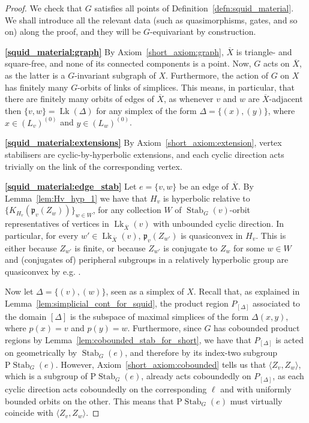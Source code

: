 \documentclass[svgnames]{amsart}
\theoremstyle{plain}
\theoremstyle{definition}
\newcommand{\ov}[1]{\overline{#1}}
\newcommand{\link}{\operatorname{Lk}}
\newcommand{\Stab}[2]{\operatorname{Stab}_{#1}(#2)}
\newcommand{\p}{\mathfrak{p}}
\begin{document}
\begin{proof}
We check that $G$ satisfies all points of Definition~\ref{defn:squid_material}. We shall introduce all the relevant data (such as quasimorphisms, gates, and so on) along the proof, and they will be $G$-equivariant by construction.

\par\medskip
\textbf{\eqref{squid_material:graph}} By Axiom~\eqref{short_axiom:graph}, $\ov X$ is triangle- and square-free, and none of its connected components is a point. Now, $G$ acts on $\ov X$, as the latter is a $G$-invariant subgraph of $X$. Furthermore, the action of $G$ on $X$ has finitely many $G$-orbits of links of simplices. This means, in particular, that there are finitely many orbits of edges of $\ov{X}$, as whenever $v$ and $w$ are $\ov{X}$-adjacent then $\{v,w\}=\link(\Delta)$ for any simplex of the form $\Delta=\{(x), (y)\}$, where $x\in (L_v)^{(0)}$ and $y\in (L_w)^{(0)}$.

\par\medskip
\textbf{\eqref{squid_material:extensions}} By Axiom~\eqref{short_axiom:extension}, vertex stabilisers are cyclic-by-hyperbolic extensions, and each cyclic direction acts trivially on the link of the corresponding vertex.

\par\medskip
\textbf{\eqref{squid_material:edge_stab}} Let $e=\{v,w\}$ be an edge of $\ov{X}$. By Lemma~\ref{lem:Hv_hyp_1} we have that $H_v$ is hyperbolic relative to $\{K_{H_v}(\p_v(Z_w))\}_{w\in W}$, for any collection $W$ of $\Stab{G}{v}$-orbit representatives of vertices in $\link_{\ov X}(v)$ with unbounded cyclic direction. In particular, for every $w'\in\link_{\ov X}(v)$, $\p_v(Z_{w'})$ is quasiconvex in $H_v$. This is either because $Z_{w'}$ is finite, or because $Z_{w'}$ is conjugate to $Z_w$ for some $w\in W$ and (conjugates of) peripheral subgroups in a relatively hyperbolic group are quasiconvex by e.g. \cite[Lemma 4.15]{drutu-sapir}. 

Now let $\Delta=\{(v), (w)\}$, seen as a simplex of $X$. Recall that, as explained in Lemma~\ref{lem:simplicial_cont_for_squid}, the product region $P_{[\Delta]}$ associated to the domain $[\Delta]$ is the subspace of maximal simplices of the form $\Delta(x,y)$, where $p(x)=v$ and $p(y)=w$. Furthermore, since $G$ has cobounded product regions by Lemma~\ref{lem:cobounded_stab_for_short}, we have that $P_{[\Delta]}$ is acted on geometrically by $\Stab{G}{e}$, and therefore by its index-two subgroup $\text{P}\Stab{G}{e}$. However, Axiom~\eqref{short_axiom:cobounded} tells us that $\langle Z_v, Z_w\rangle$, which is a subgroup of $\text{P}\Stab{G}{e}$, already acts coboundedly on $P_{[\Delta]}$, as each cyclic direction acts coboundedly on the corresponding $\ell$ and with uniformly bounded orbits on the other. This means that $\text{P}\Stab{G}{e}$ must virtually coincide with $\langle Z_v, Z_w\rangle$. 


\end{proof}
\end{document}
